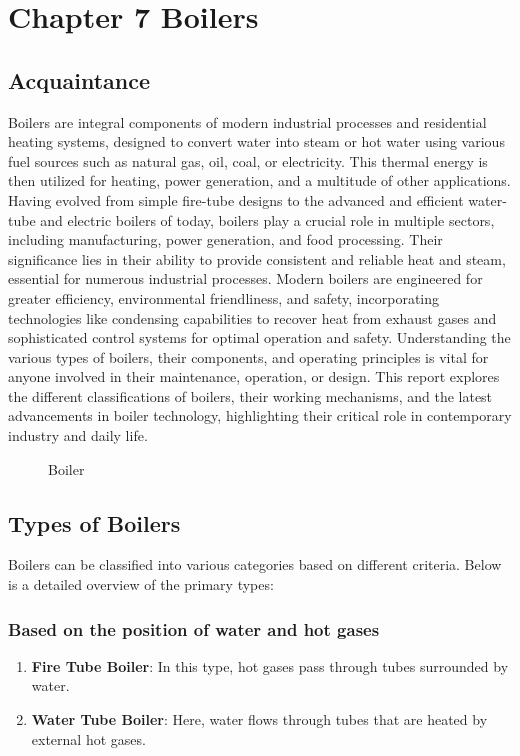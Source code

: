 \section{Chapter 7 Boilers}
\subsection{Acquaintance}
Boilers are integral components of modern industrial processes and residential heating systems, designed to convert water into steam or hot water using various fuel sources such as natural gas, oil, coal, or electricity. This thermal energy is then utilized for heating, power generation, and a multitude of other applications. Having evolved from simple fire-tube designs to the advanced and efficient water-tube and electric boilers of today, boilers play a crucial role in multiple sectors, including manufacturing, power generation, and food processing. Their significance lies in their ability to provide consistent and reliable heat and steam, essential for numerous industrial processes. Modern boilers are engineered for greater efficiency, environmental friendliness, and safety, incorporating technologies like condensing capabilities to recover heat from exhaust gases and sophisticated control systems for optimal operation and safety. Understanding the various types of boilers, their components, and operating principles is vital for anyone involved in their maintenance, operation, or design. This report explores the different classifications of boilers, their working mechanisms, and the latest advancements in boiler technology, highlighting their critical role in contemporary industry and daily life.

\begin{figure}[h]
\centering
\caption{Boiler}
\label{fig:boiler}
\end{figure}


\subsection{Types of Boilers}
Boilers can be classified into various categories based on different criteria. Below is a detailed overview of the primary types:

\subsubsection{Based on the position of water and hot gases}
\begin{enumerate}
    \item \textbf{Fire Tube Boiler}: In this type, hot gases pass through tubes surrounded by water.
    \item \textbf{Water Tube Boiler}: Here, water flows through tubes that are heated by external hot gases.
\end{enumerate}

